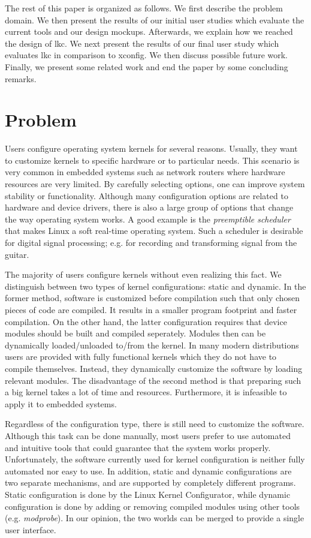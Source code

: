 \documentclass{chi2009}
\begin{document}
The rest of this paper is organized as follows. We first describe the problem domain. We then present the results of our initial user studies which evaluate the
current tools and our design mockups. Afterwards, we explain how we reached the design of \textsf{lkc}. We next present the results of our final user study
which evaluates \textsf{lkc} in comparison to \textsf{xconfig}. We then discuss possible future work. Finally, we present some related work and end the paper by
some concluding remarks.

\section{Problem}\label{sec:problem}

Users configure operating system kernels for several reasons. Usually, they want to customize kernels to specific hardware or to particular needs. This
scenario is very common in embedded systems such as network routers where hardware resources are very limited. By carefully selecting options, one can improve
system stability or functionality. Although many configuration options are related to hardware and device drivers, there is also a large group of options that
change the way operating system works. A good example is the \textit{preemptible scheduler} that makes Linux a soft real-time operating system. Such a scheduler
is desirable for digital signal processing; e.g. for recording and transforming signal from the guitar.

The majority of users configure kernels without even realizing this fact. We distinguish between two types of kernel configurations: static and dynamic. In the
former method, software is customized before compilation such that only chosen pieces of code are compiled. It results in a smaller program footprint and faster
compilation. On the other hand, the latter configuration requires that device modules should be built and compiled seperately. Modules then can be dynamically
loaded/unloaded to/from the kernel. In many modern distributions users are provided with fully functional kernels which they do not have to compile themselves.
Instead, they dynamically customize the software by loading relevant modules. The disadvantage of the second method is that preparing such a big kernel takes a
lot of time and resources. Furthermore, it is infeasible to apply it to embedded systems.

Regardless of the configuration type, there is still need to customize the software. Although this task can be done manually, most users prefer to use automated
and intuitive tools that could guarantee that the system works properly. Unfortunately, the software currently used for kernel configuration is neither fully
automated nor easy to use. In addition, static and dynamic configurations are two separate mechanisms, and are supported by completely different programs.
Static configuration is done by the Linux Kernel Configurator, while dynamic configuration is done by adding or removing compiled modules using other tools
(e.g. \textit{modprobe}). In our opinion, the two worlds can be merged to provide a single user interface.
\end{document}
